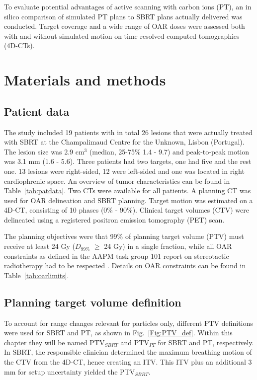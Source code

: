 To evaluate potential advantages of active scanning with carbon ions (PT), an in silico comparison of simulated PT plans to 
SBRT plans actually delivered was conducted. Target coverage and a wide range of OAR doses were assessed both with and without simulated motion on time-resolved computed tomographies (4D-CTs).



\section{Materials and methods}

\subsection{Patient data}

The study included 19 patients with in total 26 lesions that were actually treated with SBRT at the Champalimaud Centre for the Unknown, Lisbon (Portugal). The lesion size was 2.9 cm$^3$ (median, 25-75\% 1.4 - 9.7) and peak-to-peak motion was 3.1 mm (1.6 - 5.6). Three patients had two targets, one had five and the rest one. 13 lesions were right-sided, 12 were left-sided and one was located in right cardiophrenic space. An overview of tumor characteristics can be found in Table~\ref{tab:patdata}.
Two CTs were available for all patients. A planning CT was used for OAR delineation and SBRT planning. Target motion was estimated on a 4D-CT, consisting of 10 phases (0\% - 90\%). Clinical target volumes (CTV) were delineated using a registered positron emission tomography (PET) scan.

The planning objectives were that 99\% of planning target volume (PTV) must receive at least 24 Gy ($D_{99\%}$ $\geq$ 24 Gy) in a single fraction, 
while all OAR constraints as defined in the AAPM task group 101 report on stereotactic radiotherapy had to be respected \cite{Benedict2010}. Details on OAR constraints can be found in Table~\ref{tab:oarlimits}.

\subsection{Planning target volume definition}

To account for range changes relevant for particles only, different PTV definitions were used for SBRT and PT, as shown in Fig.~\ref{Fig:PTV_def}. Within this chapter they will be named PTV$_{SBRT}$ and PTV$_{PT}$ for SBRT and PT, respectively.
In SBRT, the responsible clinician determined the maximum breathing motion of the CTV from the 4D-CT, hence creating an ITV. This ITV plus an additional 3 mm for setup uncertainty yielded the PTV$_{SBRT}$.

